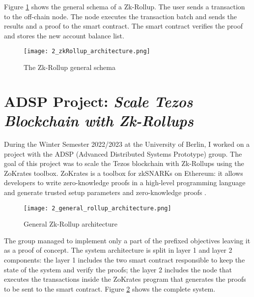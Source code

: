 Figure \ref{fig:2_zkRollup_schema} shows the general schema of a Zk-Rollup. The user sends a transaction to the off-chain node. The node executes the transaction batch and sends the results and a proof to the smart contract. The smart contract verifies the proof and stores the new account balance list.

\begin{figure}[ht]
  \centering
  \texttt{[image: 2\_zkRollup\_architecture.png]}
  \caption[Zk-Rollup schema]{The Zk-Rollup general schema \cite{noauthor_material_nodate}}  
  \label{fig:2_zkRollup_schema}
\end{figure}

\section{ADSP Project: \textit{Scale Tezos Blockchain with Zk-Rollups}}
During the Winter Semester 2022/2023 at the University of Berlin, I worked on a project with the ADSP (Advanced Distributed Systems Prototype) group. The goal of this project was to scale the Tezos blockchain with Zk-Rollups using the ZoKrates toolbox. ZoKrates is a toolbox for zkSNARKs on Ethereum: it allows developers to write zero-knowledge proofs in a high-level programming language and generate trusted setup parameters and zero-knowledge proofs \cite{eberhardt_zokrates_2018}.

\begin{figure}[ht]
  \centering
  \texttt{[image: 2\_general\_rollup\_architecture.png]}
  \caption[Zk-Rollup architecture]{General Zk-Rollup architecture}  
  \label{fig:2_general_rollup_architecture}
\end{figure}

The group managed to implement only a part of the prefixed objectives leaving it as a proof of concept. The system architecture is split in layer 1 and layer 2 components: the layer 1 includes the two smart contract responsible to keep the state of the system and verify the proofs; the layer 2 includes the node that executes the transactions inside the ZoKrates program that generates the proofs to be sent to the smart contract. Figure \ref{fig:2_general_rollup_architecture} shows the complete system.


